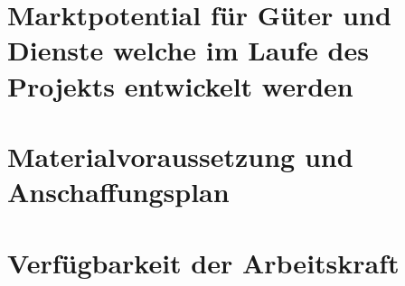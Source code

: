 \chapter{Marktpotential für Güter und Dienste welche im Laufe des Projekts entwickelt werden}

\chapter{Materialvoraussetzung und Anschaffungsplan}

\chapter{Verfügbarkeit der Arbeitskraft}
